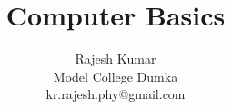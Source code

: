 \documentclass{beamer}
\begin{document}
\title{Computer Basics}
\author{Rajesh Kumar \\Model College Dumka\\kr.rajesh.phy@gmail.com}
\date{}

\begin{frame}
  \titlepage
\end{frame}







\end{document}
